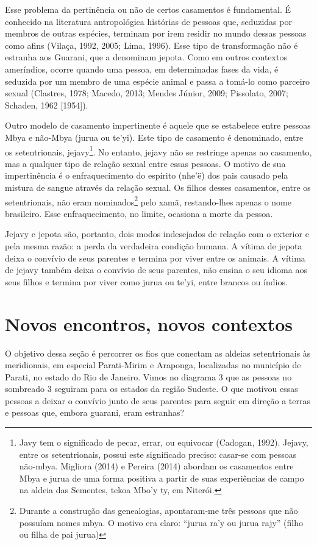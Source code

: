 Esse problema da pertinência ou não de certos casamentos é fundamental.
É conhecido na literatura antropológica histórias de pessoas que,
seduzidas por membros de outras espécies, terminam por irem residir no
mundo dessas pessoas como afins (Vilaça, 1992, 2005; Lima, 1996). Esse
tipo de transformação não é estranha aos Guarani, que a denominam
jepota. Como em outros contextos ameríndios, ocorre quando uma pessoa,
em determinadas fases da vida, é seduzida por um membro de uma espécie
animal e passa a tomá-lo como parceiro sexual (Clastres, 1978; Macedo,
2013; Mendes Júnior, 2009; Pissolato, 2007; Schaden, 1962 [1954]).

Outro modelo de casamento impertinente é aquele que se estabelece entre
pessoas Mbya e não-Mbya (jurua ou te’yi). Este tipo de casamento é
denominado, entre os setentrionais, jejavy\footnote{Javy tem o
significado de pecar, errar, ou equivocar (Cadogan, 1992). Jejavy,
entre os setentrionais, possui este significado preciso: casar-se com
pessoas não-mbya. Migliora (2014) e Pereira (2014) abordam os
casamentos entre Mbya e jurua de uma forma positiva a partir de suas
experiências de campo na aldeia das Sementes, tekoa Mbo’y ty, em
Niterói.}. No entanto, jejavy não se restringe apenas ao casamento, mas
a qualquer tipo de relação sexual entre essas pessoas. O motivo de sua
impertinência é o enfraquecimento do espírito (nhe’ë) dos pais causado
pela mistura de sangue através da relação sexual. Os filhos desses
casamentos, entre os setentrionais, não eram nominados\footnote{Durante
a construção das genealogias, apontaram-me três pessoas que não
possuíam nomes mbya. O motivo era claro: ``jurua ra’y ou jurua rajy''
(filho ou filha de pai jurua)} pelo xamã, restando-lhes apenas o nome
brasileiro. Esse enfraquecimento, no limite, ocasiona a morte da
pessoa.

Jejavy e jepota são, portanto, dois modos indesejados de relação com o
exterior e pela mesma razão: a perda da verdadeira condição humana.
A vítima de jepota deixa o convívio de seus parentes e termina por
viver entre os animais. A vítima de jejavy também deixa o convívio de
seus parentes, não ensina o seu idioma aos seus filhos e termina por
viver como jurua ou te’yi, entre brancos ou índios. 

\section{Novos encontros, novos contextos}

O objetivo dessa seção é percorrer os fios que conectam as aldeias
setentrionais às meridionais, em especial Parati-Mirim e Araponga,
localizadas no município de Parati, no estado do Rio de Janeiro. Vimos
no diagrama 3 que as pessoas no sombreado 3 seguiram para os estados da
região Sudeste. O que motivou essas pessoas a deixar o convívio junto
de seus parentes para seguir em direção a terras e pessoas que, embora
guarani, eram estranhas?

